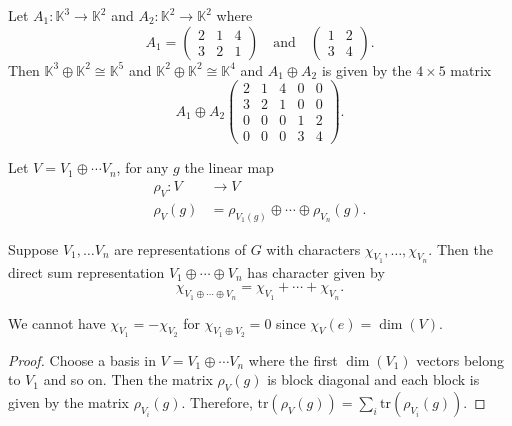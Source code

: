 \documentclass[12pt, a4paper]{article}
\newcommand{\KK}{\mathbb{K}}
\begin{document}
\begin{example}
    Let \(A_1 : \KK^3 \to \KK^2\) and \(A_2 : \KK^2 \to \KK^2\) where 
    \[A_1 = \begin{pmatrix} 2 & 1 & 4 \\ 3 & 2 & 1 \end{pmatrix} \quad \text{and} \quad \begin{pmatrix} 1 & 2 \\ 3 & 4 \end{pmatrix}.\]
    Then \(\KK^3\oplus \KK^2 \cong \KK^5\) and \(\KK^2 \oplus \KK^2 \cong \KK^4\) and \(A_1 \oplus A_2\) is given by the \(4\times 5\) matrix 
    \[A_1 \oplus A_2 \begin{pmatrix}
        2 & 1 & 4 & 0 & 0 \\
        3 & 2 & 1 & 0 & 0 \\
        0 & 0 & 0 & 1 & 2 \\
        0 & 0 & 0 & 3 & 4
    \end{pmatrix}.\]
\end{example}

\begin{mdexample}
    Let \(V = V_1 \oplus \cdots V_n\), for any \(g\) the linear map 
    \[\begin{aligned}
        \rho_V : V &\to V \\ 
        \rho_V(g) &= \rho_{V_1(g)} \oplus \cdots \oplus \rho_{V_n}(g).
    \end{aligned}\]
\end{mdexample}

\begin{mdlemma}
    Suppose \(V_1,\ldots V_n\) are representations of \(G\) with characters \(\chi_{V_1},\ldots,\chi_{V_n}\). Then the direct sum representation \(V_1 \oplus \cdots \oplus V_n\) has character given by 
    \[\chi_{V_1 \oplus \cdots \oplus V_n} = \chi_{V_1}+\cdots +\chi_{V_n}.\]
\end{mdlemma}

\begin{mdremark}
    We cannot have \(\chi_{V_1} = -\chi_{V_2}\) for \(\chi_{V_1 \oplus V_2} =0\) since \(\chi_V(e) =\dim(V)\).
\end{mdremark}

\begin{proof}
    Choose a basis in \(V = V_1 \oplus \cdots V_n\) where the first \(\dim(V_1)\) vectors belong to \(V_1\) and so on. Then the matrix \(\rho_V(g)\) is block diagonal and each block is given by the matrix \(\rho_{V_i}(g)\). Therefore, \(\text{tr}(\rho_V(g))=\sum_i \text{tr}(\rho_{V_i}(g))\).
\end{proof}
\end{document}
